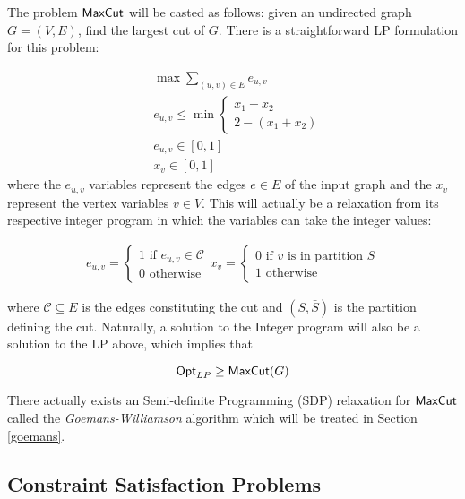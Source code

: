 \begin{example} \label{maxcutexample}
The problem $\mathsf{MaxCut}$ will be casted as follows: given an undirected graph $G=(V,E)$, find the largest cut of $G$. There is a straightforward LP formulation for this problem:

\begin{align}
  &  \max \sum_{(u,v) \in E} e_{u,v} \\
  & e_{u,v} \leq
  \min \begin{cases}
      x_1 + x_2 \\
      2 - (x_1 + x_2)
  \end{cases} \\
  & e_{u,v} \in [0,1] \\
  & x_v \in [0,1]
\end{align}
%
where the $e_{u,v}$ variables represent the edges $e \in E$ of the input graph and the $x_v$ represent the vertex variables $v \in V$. This will actually be a relaxation from its respective integer program in which the variables can take the integer values:

\begin{align}
  e_{u,v} = \begin{cases}
              1 \text{ if } e_{u,v} \in \mathcal{C} \\
              0 \text{ otherwise }
            \end{cases}
  x_v = \begin{cases}
              0 \text{ if } v \text{ is in partition } S \\
              1 \text{ otherwise }
        \end{cases}
\end{align}

where $\mathcal{C} \subseteq E$ is the edges constituting the cut and $(S,\bar{S})$ is the partition defining the cut. Naturally, a solution to the Integer program will also be a solution to the LP above, which implies that

\[ \mathsf{Opt}_{LP} \geq \mathsf{MaxCut}(G)\]

There actually exists an Semi-definite Programming (SDP) relaxation for $\mathsf{MaxCut}$ called the \emph{Goemans-Williamson} algorithm which will be treated in Section \ref{goemans}.

\end{example}

\subsection{Constraint Satisfaction Problems}

